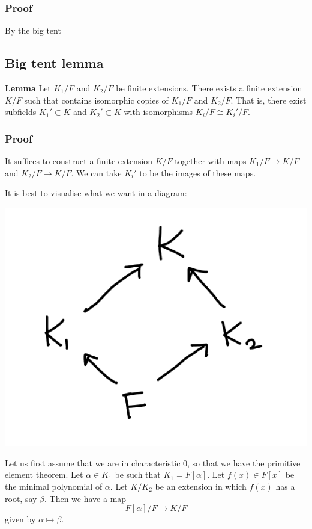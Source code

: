 \documentclass[11pt]{article}
\begin{document}
\subsubsection{Proof}
\label{sec:orge115f2e}
By the big tent 
\subsection{Big tent lemma}
\label{sec:org6e98475}
\textbf{Lemma} Let \(K_1/F\) and \(K_2/F\) be finite extensions.
There exists a finite extension \(K/F\) such that contains isomorphic copies of \(K_1/F\) and \(K_2/F\).
That is, there exist subfields \(K_{1}' \subset K\) and \(K_2' \subset K\) with isomorphisms \(K_{i}/F \cong K_{i}'/F\).
\subsubsection{Proof}
\label{sec:org87d2b19}
It suffices to construct a finite extension \(K/F\) together with maps \(K_1/F \to K/F\) and \(K_2/F \to K/F\).  We can take \(K_i'\) to be the images of these maps.

It is best to visualise what we want in a diagram:
\begin{center}
\includegraphics[width=.9\linewidth]{assets/Course_notes/2023-04-24_11-50-13_screenshot.png}
\end{center}

Let us first assume that we are in characteristic 0, so that we have the primitive element theorem.
Let \(\alpha \in K_1\) be such that \(K_1 = F[\alpha]\).
Let \(f(x) \in F[x]\) be the minimal polynomial of \(\alpha\).
Let \(K/K_2\) be an extension in which \(f(x)\) has a root, say \(\beta\).
Then we have a map
\[ F[\alpha]/F \to K/F\]
given by \(\alpha \mapsto \beta\).
\end{document}
